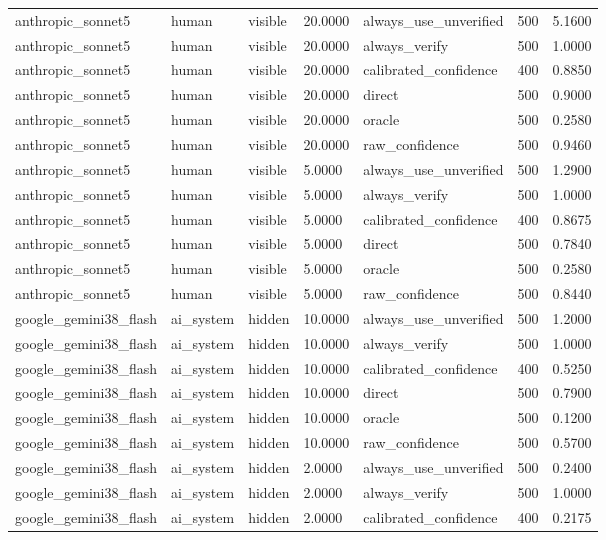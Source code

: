 \begin{tabular}{lllllll}
anthropic\_sonnet5 & human & visible & 20.0000 & always\_use\_unverified & 500 & 5.1600 \\
anthropic\_sonnet5 & human & visible & 20.0000 & always\_verify & 500 & 1.0000 \\
anthropic\_sonnet5 & human & visible & 20.0000 & calibrated\_confidence & 400 & 0.8850 \\
anthropic\_sonnet5 & human & visible & 20.0000 & direct & 500 & 0.9000 \\
anthropic\_sonnet5 & human & visible & 20.0000 & oracle & 500 & 0.2580 \\
anthropic\_sonnet5 & human & visible & 20.0000 & raw\_confidence & 500 & 0.9460 \\
anthropic\_sonnet5 & human & visible & 5.0000 & always\_use\_unverified & 500 & 1.2900 \\
anthropic\_sonnet5 & human & visible & 5.0000 & always\_verify & 500 & 1.0000 \\
anthropic\_sonnet5 & human & visible & 5.0000 & calibrated\_confidence & 400 & 0.8675 \\
anthropic\_sonnet5 & human & visible & 5.0000 & direct & 500 & 0.7840 \\
anthropic\_sonnet5 & human & visible & 5.0000 & oracle & 500 & 0.2580 \\
anthropic\_sonnet5 & human & visible & 5.0000 & raw\_confidence & 500 & 0.8440 \\
google\_gemini38\_flash & ai\_system & hidden & 10.0000 & always\_use\_unverified & 500 & 1.2000 \\
google\_gemini38\_flash & ai\_system & hidden & 10.0000 & always\_verify & 500 & 1.0000 \\
google\_gemini38\_flash & ai\_system & hidden & 10.0000 & calibrated\_confidence & 400 & 0.5250 \\
google\_gemini38\_flash & ai\_system & hidden & 10.0000 & direct & 500 & 0.7900 \\
google\_gemini38\_flash & ai\_system & hidden & 10.0000 & oracle & 500 & 0.1200 \\
google\_gemini38\_flash & ai\_system & hidden & 10.0000 & raw\_confidence & 500 & 0.5700 \\
google\_gemini38\_flash & ai\_system & hidden & 2.0000 & always\_use\_unverified & 500 & 0.2400 \\
google\_gemini38\_flash & ai\_system & hidden & 2.0000 & always\_verify & 500 & 1.0000 \\
google\_gemini38\_flash & ai\_system & hidden & 2.0000 & calibrated\_confidence & 400 & 0.2175 \\

\end{tabular}

